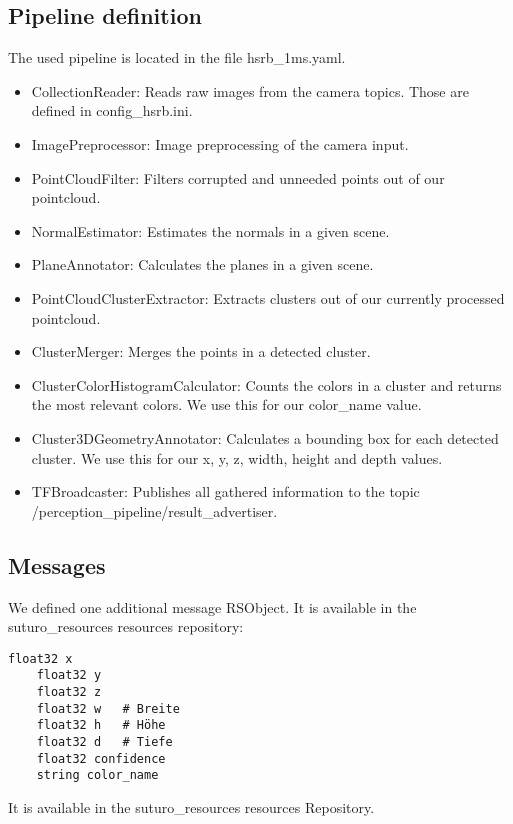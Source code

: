 \documentclass[main.tex]{subfiles}
\begin{document}
 	\subsection{Pipeline definition}
 	The used pipeline is located in the file hsrb\_1ms.yaml.
 	\begin{itemize}
  		\item CollectionReader: Reads raw images from the camera topics. Those are defined in config\_hsrb.ini.
  		\item ImagePreprocessor: Image preprocessing of the camera input.
  		\item PointCloudFilter: Filters corrupted and unneeded points out of our pointcloud.
  		\item NormalEstimator: Estimates the normals in a given scene.
  		\item  PlaneAnnotator: Calculates the planes in a given scene.
  		\item  PointCloudClusterExtractor: Extracts clusters out of our currently processed pointcloud.
  		\item  ClusterMerger: Merges the points in a detected cluster.
  		\item  ClusterColorHistogramCalculator: Counts the colors in a cluster and returns the most relevant colors. We use this for our color\_name value.
  		\item  Cluster3DGeometryAnnotator: Calculates a bounding box for each detected cluster. We use this for our x, y, z, width, height and depth values.
  		\item TFBroadcaster: Publishes all gathered information to the topic /perception\_pipeline/result\_advertiser.
  	\end{itemize}
  
 	\subsection{Messages}
 	We defined one additional message RSObject. It is available in the suturo\_resources resources repository:
 	
 	\begin{verbatim}float32 x 
	float32 y
	float32 z
	float32 w 	# Breite
	float32 h 	# Höhe
	float32 d 	# Tiefe
	float32 confidence
	string color_name
\end{verbatim}

	It is available in the suturo\_resources resources Repository.
\end{document}
